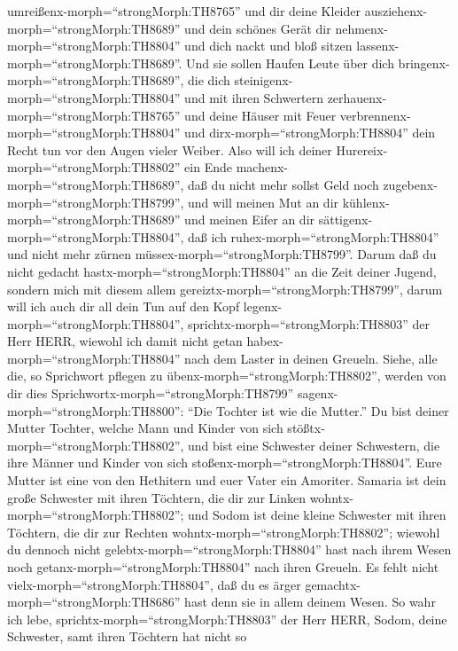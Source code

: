 umreißenx-morph=``strongMorph:TH8765'' und dir deine Kleider
ausziehenx-morph=``strongMorph:TH8689'' und dein schönes Gerät dir
nehmenx-morph=``strongMorph:TH8804'' und dich nackt und bloß sitzen
lassenx-morph=``strongMorph:TH8689''.  Und sie sollen
Haufen Leute über dich bringenx-morph=``strongMorph:TH8689'', die dich
steinigenx-morph=``strongMorph:TH8804'' und mit ihren Schwertern
zerhauenx-morph=``strongMorph:TH8765''  und deine Häuser
mit Feuer verbrennenx-morph=``strongMorph:TH8804'' und
dirx-morph=``strongMorph:TH8804'' dein Recht tun vor den Augen vieler
Weiber. Also will ich deiner Hurereix-morph=``strongMorph:TH8802'' ein
Ende machenx-morph=``strongMorph:TH8689'', daß du nicht mehr sollst Geld
noch zugebenx-morph=``strongMorph:TH8799'',  und will
meinen Mut an dir kühlenx-morph=``strongMorph:TH8689'' und meinen Eifer
an dir sättigenx-morph=``strongMorph:TH8804'', daß ich
ruhex-morph=``strongMorph:TH8804'' und nicht mehr zürnen
müssex-morph=``strongMorph:TH8799''.  Darum daß du nicht
gedacht hastx-morph=``strongMorph:TH8804'' an die Zeit deiner Jugend,
sondern mich mit diesem allem gereiztx-morph=``strongMorph:TH8799'',
darum will ich auch dir all dein Tun auf den Kopf
legenx-morph=``strongMorph:TH8804'',
sprichtx-morph=``strongMorph:TH8803'' der Herr HERR, wiewohl ich damit
nicht getan habex-morph=``strongMorph:TH8804'' nach dem Laster in deinen
Greueln.  Siehe, alle die, so Sprichwort pflegen zu
übenx-morph=``strongMorph:TH8802'', werden von dir dies
Sprichwortx-morph=``strongMorph:TH8799''
sagenx-morph=``strongMorph:TH8800'': ``Die Tochter ist wie die Mutter.''
 Du bist deiner Mutter Tochter, welche Mann und Kinder von
sich stößtx-morph=``strongMorph:TH8802'', und bist eine Schwester deiner
Schwestern, die ihre Männer und Kinder von sich
stoßenx-morph=``strongMorph:TH8804''. Eure Mutter ist eine von den
Hethitern und euer Vater ein Amoriter.  Samaria ist dein
große Schwester mit ihren Töchtern, die dir zur Linken
wohntx-morph=``strongMorph:TH8802''; und Sodom ist deine kleine
Schwester mit ihren Töchtern, die dir zur Rechten
wohntx-morph=``strongMorph:TH8802'';  wiewohl du dennoch
nicht gelebtx-morph=``strongMorph:TH8804'' hast nach ihrem Wesen noch
getanx-morph=``strongMorph:TH8804'' nach ihren Greueln. Es fehlt nicht
vielx-morph=``strongMorph:TH8804'', daß du es ärger
gemachtx-morph=``strongMorph:TH8686'' hast denn sie in allem deinem
Wesen.  So wahr ich lebe,
sprichtx-morph=``strongMorph:TH8803'' der Herr HERR, Sodom, deine
Schwester, samt ihren Töchtern hat nicht so
